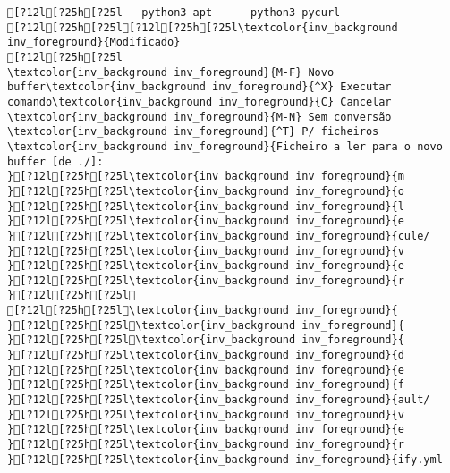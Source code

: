 \documentclass{scrartcl}
\begin{document}
\begin{Verbatim}
[?12l[?25h[?25l - python3-apt    - python3-pycurl
[?12l[?25h[?25l[?12l[?25h[?25l\textcolor{inv_background inv_foreground}{Modificado}
[?12l[?25h[?25l                                \textcolor{inv_background inv_foreground}{M-F} Novo buffer\textcolor{inv_background inv_foreground}{^X} Executar comando\textcolor{inv_background inv_foreground}{C} Cancelar           \textcolor{inv_background inv_foreground}{M-N} Sem conversão       \textcolor{inv_background inv_foreground}{^T} P/ ficheiros
\textcolor{inv_background inv_foreground}{Ficheiro a ler para o novo buffer [de ./]:                                                                                                                                                   }[?12l[?25h[?25l\textcolor{inv_background inv_foreground}{m
}[?12l[?25h[?25l\textcolor{inv_background inv_foreground}{o
}[?12l[?25h[?25l\textcolor{inv_background inv_foreground}{l
}[?12l[?25h[?25l\textcolor{inv_background inv_foreground}{e
}[?12l[?25h[?25l\textcolor{inv_background inv_foreground}{cule/
}[?12l[?25h[?25l\textcolor{inv_background inv_foreground}{v
}[?12l[?25h[?25l\textcolor{inv_background inv_foreground}{e
}[?12l[?25h[?25l\textcolor{inv_background inv_foreground}{r
}[?12l[?25h[?25l
[?12l[?25h[?25l\textcolor{inv_background inv_foreground}{ 
}[?12l[?25h[?25l\textcolor{inv_background inv_foreground}{ 
}[?12l[?25h[?25l\textcolor{inv_background inv_foreground}{ 
}[?12l[?25h[?25l\textcolor{inv_background inv_foreground}{d
}[?12l[?25h[?25l\textcolor{inv_background inv_foreground}{e
}[?12l[?25h[?25l\textcolor{inv_background inv_foreground}{f
}[?12l[?25h[?25l\textcolor{inv_background inv_foreground}{ault/
}[?12l[?25h[?25l\textcolor{inv_background inv_foreground}{v
}[?12l[?25h[?25l\textcolor{inv_background inv_foreground}{e
}[?12l[?25h[?25l\textcolor{inv_background inv_foreground}{r
}[?12l[?25h[?25l\textcolor{inv_background inv_foreground}{ify.yml

\end{Verbatim}
\end{document}

